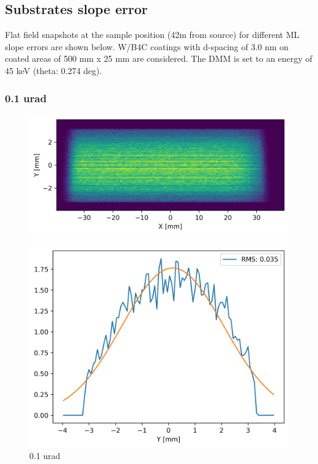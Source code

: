 \subsection{Substrates slope error}
Flat field snapshots at the sample position (42m from source) for different ML slope errors are shown below. W/B4C coatings with d-spacing of 3.0 nm on coated areas of 500 mm x 25 mm are considered. The DMM is set to an energy of 45 keV (theta: 0.274 deg).

\clearpage
\subsubsection{0.1 urad}
\begin{figure}[H]
\centering
\includegraphics[width=0.9\linewidth]{./../figures/slope_error/WB4C_d30_d-spacing_gradient_45keV_slope_error01urad.png}
\end{figure}

\begin{figure}[H]
\centering
\includegraphics[width=0.9\linewidth]{./../figures/slope_error/WB4C_d30_d-spacing_gradient_45keV_slope_error01urad_Yprofile.png}
\caption{0.1 urad}
\label{fig:01urad}
\end{figure}

